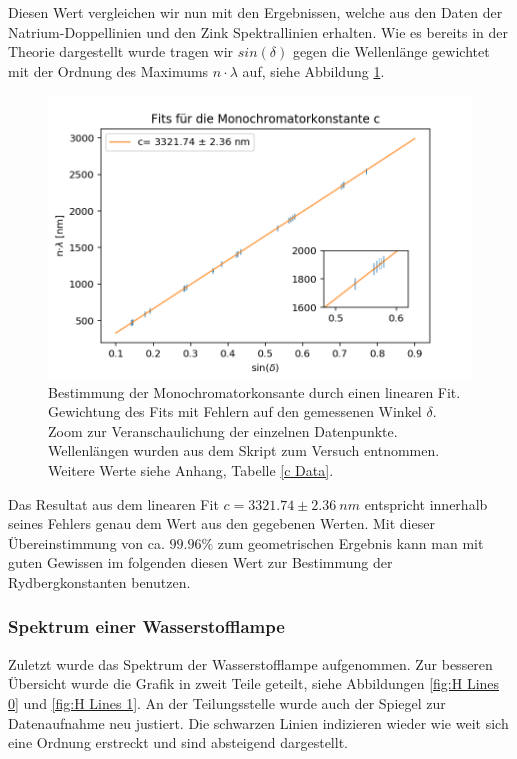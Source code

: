 \documentclass[]{article}
\begin{document}
Diesen Wert vergleichen wir nun mit den Ergebnissen, welche aus den Daten der Natrium-Doppellinien und den Zink Spektrallinien erhalten. Wie es bereits in der Theorie dargestellt wurde tragen wir $sin(\delta)$ gegen die Wellenlänge gewichtet mit der Ordnung des Maximums $n\cdot\lambda$ auf, siehe Abbildung \ref{fig:MonoConst}.

\begin{figure}[H]
\centering
\includegraphics[width=.9\linewidth]{Plots/Monochromatorkonstante.png}
\caption{Bestimmung der Monochromatorkonsante durch einen linearen Fit. Gewichtung des Fits mit Fehlern auf den gemessenen Winkel $\delta$. Zoom zur Veranschaulichung der einzelnen Datenpunkte. Wellenlängen wurden aus dem Skript zum Versuch \cite{skript} entnommen. Weitere Werte siehe Anhang, Tabelle \ref{c Data}. }
\label{fig:MonoConst}
\end{figure}

Das Resultat aus dem linearen Fit $c = 3321.74 \pm 2.36 \: nm$ entspricht innerhalb seines Fehlers genau dem Wert aus den gegebenen Werten. Mit dieser Übereinstimmung von ca. $99.96\%$ zum geometrischen Ergebnis kann man mit guten Gewissen im folgenden diesen Wert zur Bestimmung der Rydbergkonstanten benutzen.

\subsubsection{Spektrum einer Wasserstofflampe}
Zuletzt wurde das Spektrum der Wasserstofflampe aufgenommen. Zur besseren Übersicht wurde die Grafik in zweit Teile geteilt, siehe Abbildungen \ref{fig:H Lines 0} und \ref{fig:H Lines 1}. An der Teilungsstelle wurde auch der Spiegel zur Datenaufnahme neu justiert. Die schwarzen Linien indizieren wieder wie weit sich eine Ordnung erstreckt und sind absteigend dargestellt.
\end{document}
